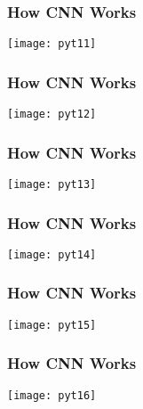 \begin{frame}[fragile] \frametitle{How CNN Works}
\begin{center}
\texttt{[image: pyt11]}
\end{center}

\end{frame}

\begin{frame}[fragile] \frametitle{How CNN Works}
\begin{center}
\texttt{[image: pyt12]}
\end{center}

\end{frame}

\begin{frame}[fragile] \frametitle{How CNN Works}
\begin{center}
\texttt{[image: pyt13]}
\end{center}

\end{frame}

\begin{frame}[fragile] \frametitle{How CNN Works}
\begin{center}
\texttt{[image: pyt14]}
\end{center}

\end{frame}

\begin{frame}[fragile] \frametitle{How CNN Works}
\begin{center}
\texttt{[image: pyt15]}
\end{center}

\end{frame}

\begin{frame}[fragile] \frametitle{How CNN Works}
\begin{center}
\texttt{[image: pyt16]}
\end{center}

\end{frame}


